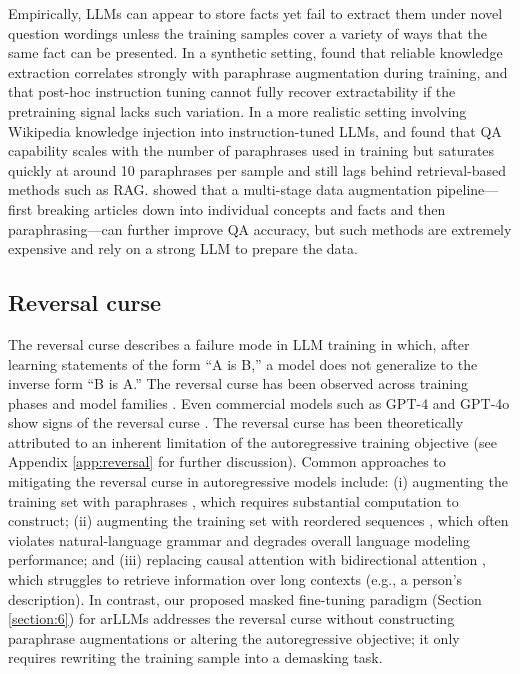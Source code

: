 Empirically, LLMs can appear to store facts yet fail to extract them under novel question wordings unless the training samples cover a variety of ways that the same fact can be presented. In a synthetic setting, \citet{zhu24a} found that reliable knowledge extraction correlates strongly with paraphrase augmentation during training, and that post-hoc instruction tuning cannot fully recover extractability if the pretraining signal lacks such variation. In a more realistic setting involving Wikipedia knowledge injection into instruction-tuned LLMs, \citet{ovadia2023fine} and \citet{mecklenburg2024injecting} found that QA capability scales with the number of paraphrases used in training but saturates quickly at around 10 paraphrases per sample and still lags behind retrieval-based methods such as RAG. \citet{ovadia2025knowledge} showed that a multi-stage data augmentation pipeline—first breaking articles down into individual concepts and facts and then paraphrasing—can further improve QA accuracy, but such methods are extremely expensive and rely on a strong LLM to prepare the data.

\subsection{Reversal curse}

The reversal curse describes a failure mode in LLM training in which, after learning statements of the form “A is B,” a model does not generalize to the inverse form “B is A.” The reversal curse has been observed across training phases and model families \citep{berglund2023reversal, zhu24b, lv-etal-2024-analysis, lin2024delving, guo-etal-2024-mitigating, golovneva2024reverse, lu2024rethinking}. Even commercial models such as GPT-4 and GPT-4o show signs of the reversal curse \citep{berglund2023reversal, llada}. The reversal curse has been theoretically attributed to an inherent limitation of the autoregressive training objective \citep{zhu2024towards, kitouni2024factorization} (see Appendix \ref{app:reversal} for further discussion). Common approaches to mitigating the reversal curse in autoregressive models include: (i) augmenting the training set with paraphrases \citep{lu2024rethinking}, which requires substantial computation to construct; (ii) augmenting the training set with reordered sequences \citep{guo-etal-2024-mitigating, golovneva2024reverse}, which often violates natural-language grammar and degrades overall language modeling performance; and (iii) replacing causal attention with bidirectional attention \citep{lv-etal-2024-analysis}, which struggles to retrieve information over long contexts (e.g., a person’s description). In contrast, our proposed masked fine-tuning paradigm (Section \ref{section:6}) for arLLMs addresses the reversal curse without constructing paraphrase augmentations or altering the autoregressive objective; it only requires rewriting the training sample into a demasking task.

